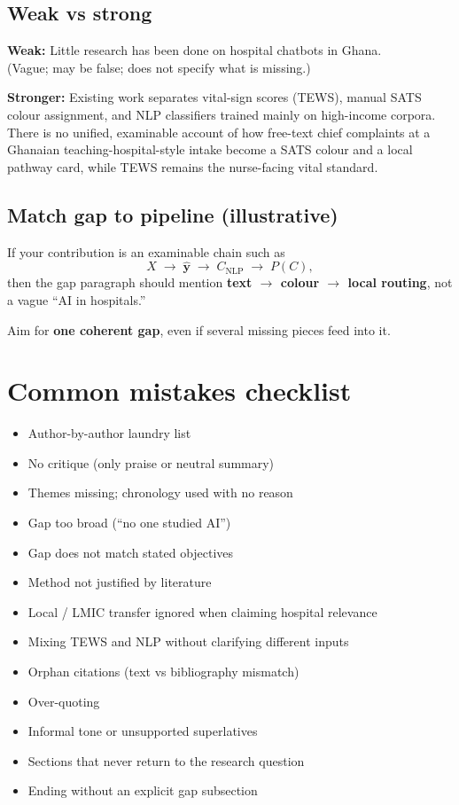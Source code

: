 \documentclass[11pt,a4paper]{article}
\begin{document}
\subsection{Weak vs strong}

\begin{examplebox}
\textbf{Weak:} Little research has been done on hospital chatbots in Ghana.\\
(Vague; may be false; does not specify what is missing.)

\textbf{Stronger:} Existing work separates vital-sign scores (TEWS), manual SATS colour assignment, and NLP classifiers trained mainly on high-income corpora.
There is no unified, examinable account of how free-text chief complaints at a Ghanaian teaching-hospital-style intake become a SATS colour and a local pathway card, while TEWS remains the nurse-facing vital standard.
\end{examplebox}

\subsection{Match gap to pipeline (illustrative)}
If your contribution is an examinable chain such as
\[
X \;\to\; \hat{\mathbf{y}} \;\to\; C_{\mathrm{NLP}} \;\to\; P(C),
\]
then the gap paragraph should mention \textbf{text \(\to\) colour \(\to\) local routing}, not a vague ``AI in hospitals.''

Aim for \textbf{one coherent gap}, even if several missing pieces feed into it.

\section{Common mistakes checklist}

\begin{itemize}[label=$\square$]
  \item Author-by-author laundry list
  \item No critique (only praise or neutral summary)
  \item Themes missing; chronology used with no reason
  \item Gap too broad (``no one studied AI'')
  \item Gap does not match stated objectives
  \item Method not justified by literature
  \item Local / LMIC transfer ignored when claiming hospital relevance
  \item Mixing TEWS and NLP without clarifying different inputs
  \item Orphan citations (text vs bibliography mismatch)
  \item Over-quoting
  \item Informal tone or unsupported superlatives
  \item Sections that never return to the research question
  \item Ending without an explicit gap subsection
\end{itemize}
\end{document}
